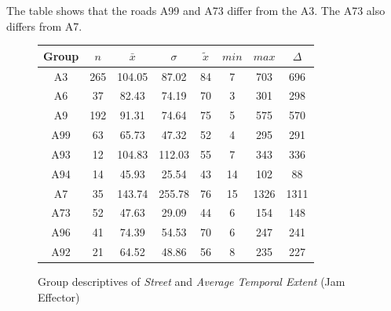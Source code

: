The table shows that the roads A99 and A73 differ from the A3. The A73 also differs from A7.
\begin{figure}[ht!]
	\centering
	\begin{minipage}{0.5\textwidth}
		\tiny
		\centering
		\begin{tabular}{c|c|c|c|c|c|c|c}
			\toprule
			Group & $n$ & $\bar{x}$ & $\sigma$ & $\tilde{x}$ & $min$ & $max$ & $\Delta$ \\
			\midrule
			A3   & 265 & 104.05 & 87.02  & 84 & 7  & 703  & 696  \\ 
			A6   & 37  & 82.43  & 74.19  & 70 & 3  & 301  & 298  \\ 
			A9   & 192 & 91.31  & 74.64  & 75 & 5  & 575  & 570  \\  
			A99  & 63  & 65.73  & 47.32  & 52 & 4  & 295  & 291  \\ 
			A93  & 12  & 104.83 & 112.03 & 55 & 7  & 343  & 336  \\ 
			A94  & 14  & 45.93  & 25.54  & 43 & 14 & 102  & 88   \\ 
			A7   & 35  & 143.74 & 255.78 & 76 & 15 & 1326 & 1311 \\ 
			A73  & 52  & 47.63  & 29.09  & 44 & 6  & 154  & 148  \\ 
			A96  & 41  & 74.39  & 54.53  & 70 & 6  & 247  & 241  \\ 
			A92  & 21  & 64.52  & 48.86  & 56 & 8  & 235  & 227  \\ 
			\bottomrule
		\end{tabular}
		\label{tbl:descriptives_baysis_effector_Street_TAvg}
	\end{minipage}%
	\begin{minipage}{0.55\textwidth}
		\data
		\pgfplotstablesort[sort key=mean, sort cmp=float >]{\datasorted}{\data}
        \tiny
        \centering
		\label{fig:descriptives_baysis_effector_Street_TAvg}
	\end{minipage}%
	\caption{Group descriptives of \textit{Street} and \textit{Average Temporal Extent} (Jam Effector)}
\end{figure}
